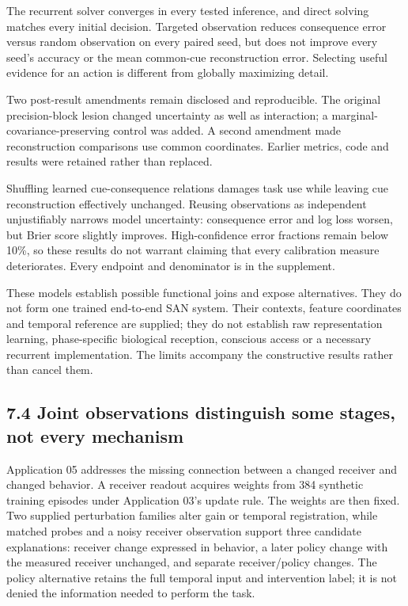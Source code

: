 \documentclass[
  american,
  11pt,
  letterpaper,
]{article}
\begin{document}
The recurrent solver converges in every tested inference, and direct solving matches every initial decision. Targeted observation reduces consequence error versus random observation on every paired seed, but does not improve every seed's accuracy or the mean common-cue reconstruction error. Selecting useful evidence for an action is different from globally maximizing detail.

Two post-result amendments remain disclosed and reproducible. The original precision-block lesion changed uncertainty as well as interaction; a marginal-covariance-preserving control was added. A second amendment made reconstruction comparisons use common coordinates. Earlier metrics, code and results were retained rather than replaced.

Shuffling learned cue-consequence relations damages task use while leaving cue reconstruction effectively unchanged. Reusing observations as independent unjustifiably narrows model uncertainty: consequence error and log loss worsen, but Brier score slightly improves. High-confidence error fractions remain below 10\%, so these results do not warrant claiming that every calibration measure deteriorates. Every endpoint and denominator is in the supplement.

These models establish possible functional joins and expose alternatives. They do not form one trained end-to-end SAN system. Their contexts, feature coordinates and temporal reference are supplied; they do not establish raw representation learning, phase-specific biological reception, conscious access or a necessary recurrent implementation. The limits accompany the constructive results rather than cancel them.

\subsection{7.4 Joint observations distinguish some stages, not every mechanism}\label{joint-observations-distinguish-some-stages-not-every-mechanism}

Application 05 addresses the missing connection between a changed receiver and changed behavior. A receiver readout acquires weights from 384 synthetic training episodes under Application 03's update rule. The weights are then fixed. Two supplied perturbation families alter gain or temporal registration, while matched probes and a noisy receiver observation support three candidate explanations: receiver change expressed in behavior, a later policy change with the measured receiver unchanged, and separate receiver/policy changes. The policy alternative retains the full temporal input and intervention label; it is not denied the information needed to perform the task.
\end{document}
